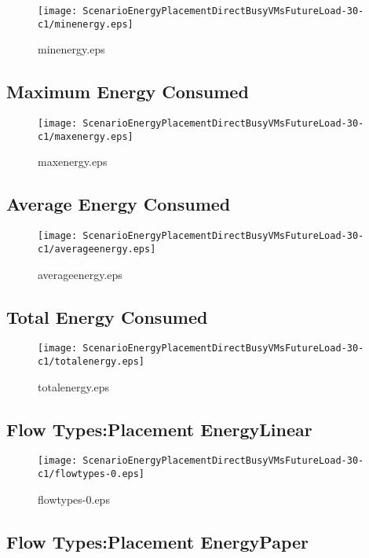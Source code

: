 \documentclass{elsart}
\begin{document}
\begin{figure}[ht]
\centering
\texttt{[image: ScenarioEnergyPlacementDirectBusyVMsFutureLoad-30-c1/minenergy.eps]}
\caption{minenergy.eps}\label{fig:minenergy}
\end{figure}

\clearpage
\subsection{Maximum Energy Consumed}

\begin{figure}[ht]
\centering
\texttt{[image: ScenarioEnergyPlacementDirectBusyVMsFutureLoad-30-c1/maxenergy.eps]}
\caption{maxenergy.eps}\label{fig:maxenergy}
\end{figure}

\clearpage
\subsection{Average Energy Consumed}

\begin{figure}[ht]
\centering
\texttt{[image: ScenarioEnergyPlacementDirectBusyVMsFutureLoad-30-c1/averageenergy.eps]}
\caption{averageenergy.eps}\label{fig:averageenergy}
\end{figure}

\clearpage
\subsection{Total Energy Consumed}

\begin{figure}[ht]
\centering
\texttt{[image: ScenarioEnergyPlacementDirectBusyVMsFutureLoad-30-c1/totalenergy.eps]}
\caption{totalenergy.eps}\label{fig:totalenergy}
\end{figure}

\clearpage
\subsection{Flow Types:Placement EnergyLinear}

\begin{figure}[ht]
\centering
\texttt{[image: ScenarioEnergyPlacementDirectBusyVMsFutureLoad-30-c1/flowtypes-0.eps]}
\caption{flowtypes-0.eps}\label{fig:flowtypes-0}
\end{figure}

\clearpage
\subsection{Flow Types:Placement EnergyPaper}
\end{document}
